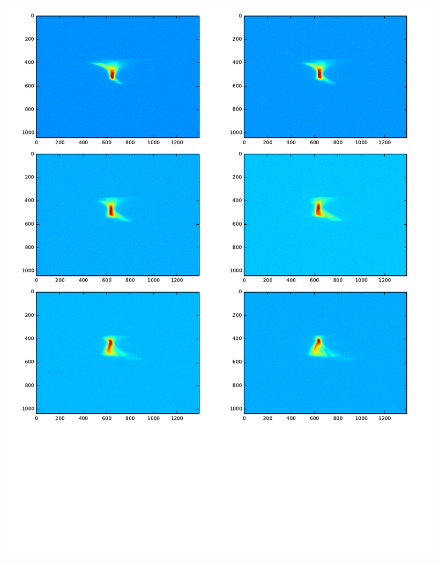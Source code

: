 \documentclass[aps,prl,twocolumn,groupedaddress]{revtex4}
\begin{document}
\begin{figure}
\includegraphics[scale=0.3,page=2]{output.pdf}
\end{figure}



% 
\end{document}
